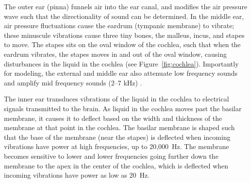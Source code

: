 The outer ear (pinna) funnels air
into the ear canal,
and modifies the air pressure wave
such that the directionality
of sound can be determined.
In the middle ear,
air pressure fluctuations
cause the eardrum (tympanic membrane)
to vibrate;
these minuscule vibrations
cause three tiny bones,
the malleus, incus, and stapes to move.
The stapes sits on the oval window
of the cochlea,
such that when the eardrum vibrates,
the stapes moves in and out of the oval window,
causing disturbances in the liquid
in the cochlea
(see Figure~\ref{fig:cochlea}).
Importantly for modeling,
the external and middle ear
also attenuate low frequency sounds
and amplify mid frequency sounds
(2--7 kHz)
\citep{rosowski1996,ballachanda1997}.


The inner ear transduces vibrations
of the liquid in the cochlea
to electrical signals transmitted
to the brain.
As liquid in the cochlea
moves past the basilar membrane,
it causes it to deflect
based on the width and thickness
of the membrane at that point
in the cochlea.
The basilar membrane
is shaped such that
the base of the membrane
(near the stapes)
is deflected when
incoming vibrations have power
at high frequencies,
up to 20,000~Hz.
The membrane becomes sensitive
to lower and lower frequencies
going further down the membrane
to the apex
in the center of the cochlea,
which is deflected when incoming vibrations
have power as low as 20~Hz.

